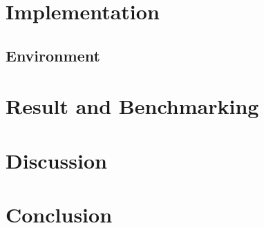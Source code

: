 \documentclass[11pt,conference]{IEEEtran}
\begin{document}
\section{Implementation}
\subsection{Environment}
\subsection{}

\section{Result and Benchmarking}



\section{Discussion}



\section{Conclusion}



\end{document}
